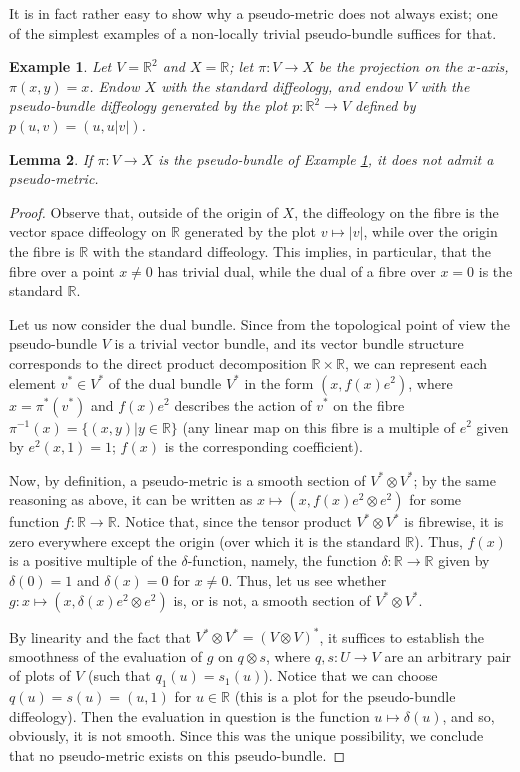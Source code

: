 \documentclass{article}
\newtheorem{lemma}{Lemma}[section]
\newtheorem{example}[lemma]{Example}
\newcommand\matR{{\mathbb{R}}}
\begin{document}
It is in fact rather easy to show why a pseudo-metric does not always exist; one of the simplest examples of a non-locally trivial pseudo-bundle suffices for that.

\begin{example}\label{no:pseudometric:exists:ex}
Let $V=\matR^2$ and $X=\matR$; let $\pi:V\to X$ be the projection on the $x$-axis, $\pi(x,y)=x$. Endow $X$ with the standard diffeology, and endow $V$ with the pseudo-bundle diffeology generated by the
plot $p:\matR^2\to V$ defined by $p(u,v)=(u,u|v|)$.
\end{example}

\begin{lemma}\label{there:is:no:pseudometric:lem}
If $\pi:V\to X$ is the pseudo-bundle of Example \ref{no:pseudometric:exists:ex}, it does not admit a pseudo-metric.
\end{lemma}

\begin{proof}
Observe that, outside of the origin of $X$, the diffeology on the fibre is the vector space diffeology on $\matR$ generated by the plot $v\mapsto|v|$, while over the origin the fibre is $\matR$ with the standard 
diffeology. This implies, in particular, that the fibre over a point $x\neq 0$ has trivial dual, while the dual of a fibre over $x=0$ is the standard $\matR$.

Let us now consider the dual bundle. Since from the topological point of view the pseudo-bundle $V$ is a trivial vector bundle, and its vector bundle structure corresponds to the direct product decomposition 
$\matR\times\matR$, we can represent each element $v^*\in V^*$ of the dual bundle $V^*$ in the form $(x,f(x)e^2)$, where $x=\pi^*(v^*)$ and $f(x)e^2$ describes the action of $v^*$ on the fibre 
$\pi^{-1}(x)=\{(x,y)|y\in\matR\}$ (any linear map on this fibre is a multiple of $e^2$ given by $e^2(x,1)=1$; $f(x)$ is the corresponding coefficient).

Now, by definition, a pseudo-metric is a smooth section of $V^*\otimes V^*$; by the same reasoning as above, it can be written as $x\mapsto(x,f(x)e^2\otimes e^2)$ for some function $f:\matR\to\matR$. Notice 
that, since the tensor product $V^*\otimes V^*$ is fibrewise, it is zero everywhere except the origin (over which it is the standard $\matR$). Thus, $f(x)$ is a positive multiple of the $\delta$-function, namely, the 
function $\delta:\matR\to\matR$ given by $\delta(0)=1$ and $\delta(x)=0$ for $x\neq 0$. Thus, let us see whether $g:x\mapsto(x,\delta(x)e^2\otimes e^2)$ is, or is not, a smooth section of $V^*\otimes V^*$.

By linearity and the fact that $V^*\otimes V^*=(V\otimes V)^*$, it suffices to establish the smoothness of the evaluation of $g$ on $q\otimes s$, where $q,s:U\to V$ are an arbitrary pair of plots of $V$ (such that 
$q_1(u)=s_1(u)$). Notice that we can choose $q(u)=s(u)=(u,1)$ for $u\in\matR$ (this is a plot for the pseudo-bundle diffeology). Then the evaluation in question is the function $u\mapsto\delta(u)$, and so, 
obviously, it is not smooth. Since this was the unique possibility, we conclude that no pseudo-metric exists on this pseudo-bundle.
\end{proof}
\end{document}
